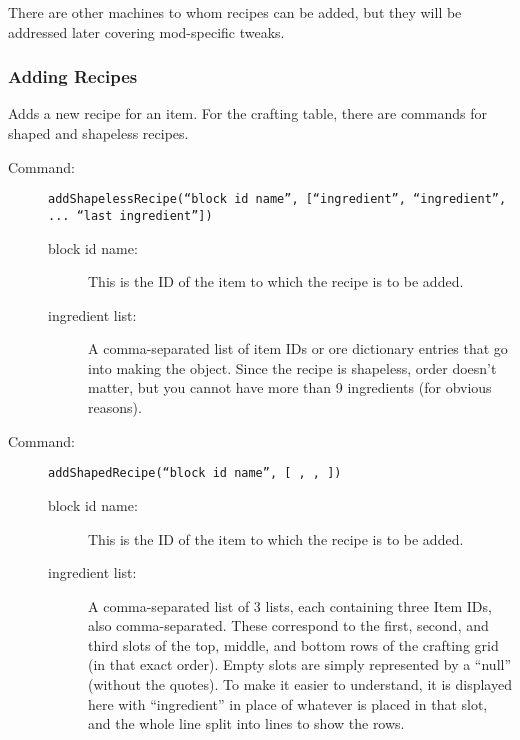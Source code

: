 \documentclass[letterpaper,titlepage,12pt]{article}
\begin{document}
There are other machines to whom recipes can be added, but they will be addressed later covering mod-specific tweaks.

\subsubsection{Adding Recipes}

Adds a new recipe for an item.  For the crafting table, there are commands for shaped and shapeless recipes.

\begin{description}
\item[Command:] \texttt{addShapelessRecipe(``block id name'', [``ingredient'', ``ingredient'', ... ``last ingredient''])}
\begin{description}
\item [block id name:] This is the ID of the item to which the recipe is to be added.
\item [ingredient list:] A comma-separated list of item IDs or ore dictionary entries that go into making the object.  Since the recipe is shapeless, order doesn't matter, but you cannot have more than 9 ingredients (for obvious reasons).
\end{description}
\end{description}

\begin{description}
\item[Command:] \texttt{addShapedRecipe(``block id name'', [ , , ])}
\begin{description}
\item [block id name:] This is the ID of the item to which the recipe is to be added.
\item [ingredient list:] A comma-separated list of 3 lists, each containing three Item IDs, also comma-separated.  These correspond to the first, second, and third slots of the top, middle, and bottom rows of the crafting grid (in that exact order).  Empty slots are simply represented by a ``null'' (without the quotes).  To make it easier to understand, it is displayed here with ``ingredient'' in place of whatever is placed in that slot, and the whole line split into lines to show the rows.
\end{description}
\end{description}
\end{document}
